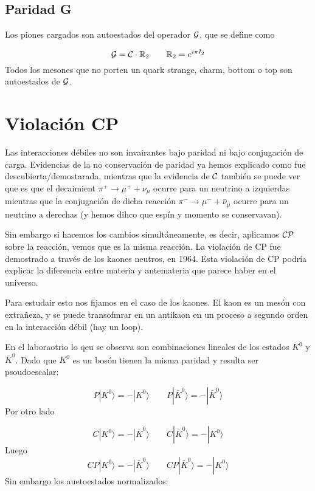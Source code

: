 \subsection{Paridad G}

Los piones cargados son autoestados del operador $\mathcal{G}$, que se define como

\begin{equation*}
    \mathcal{G} = \mathcal{C} \cdot \mathbb{R}_2 \qquad \mathbb{R}_2 = e^{i \pi I_2}
\end{equation*}
Todos los mesones que no porten un quark strange, charm, bottom o top son autoestados de $\mathcal{G}$. 


\section{Violación CP}

Las interacciones débiles no son invairantes bajo paridad ni bajo conjugación de carga. Evidencias de la no conservación de paridad ya hemos explicado como fue descubierta/demostarada, mientras que la evidencia de $\mathcal{C}$ también se puede ver que es que el decaimient $\pi^+ \to \mu^+ + \nu_\mu$ ocurre para un neutrino a izquierdas mientras que la conjugación de dicha reacción $\pi^- \to \mu^- + \bar{\nu}_\mu$ ocurre para un neutrino a derechas (y hemos dihco que espín y momento se conservavan).

Sin embargo si hacemos los cambios simultáneamente, es decir, aplicamos $\mathcal{C} \mathcal{P}$ sobre la reacción, vemos que es la misma reacción. La violación de CP fue demostrado a través de los kaones neutros, en 1964. Esta violación de CP podría explicar la diferencia entre materia y antemateria que parece haber en el universo. 

Para estudair esto nos fijamos en el caso de los kaones. El kaon es un mesón con extrañeza, y se puede transofmrar en un antikaon en un proceso a segundo orden en la interacción débil (hay un loop).

En el laboraotrio lo qeu se observa son combinaciones lineales de los estados $K^0$ y $\overline{K}^0$. Dado que $K^0$ es un bosón tienen la misma paridad y resulta ser psoudoescalar:

\begin{equation}
    P |K^0\rangle = - |K^0 \rangle  \qquad 
    P |\bar{K}^0\rangle = - |\bar{K}^0 \rangle 
\end{equation}
Por otro lado 

\begin{equation}
    C |K^0\rangle = - |\bar{K}^0 \rangle  \qquad 
    C |\bar{K}^0\rangle = - |{K}^0 \rangle 
\end{equation}
Luego 
\begin{equation}
    CP |K^0\rangle =  - |\bar{K}^0 \rangle  \qquad 
    CP |\bar{K}^0\rangle = - |{K}^0 \rangle 
\end{equation}
Sin embargo los auetoestados normalizados:


